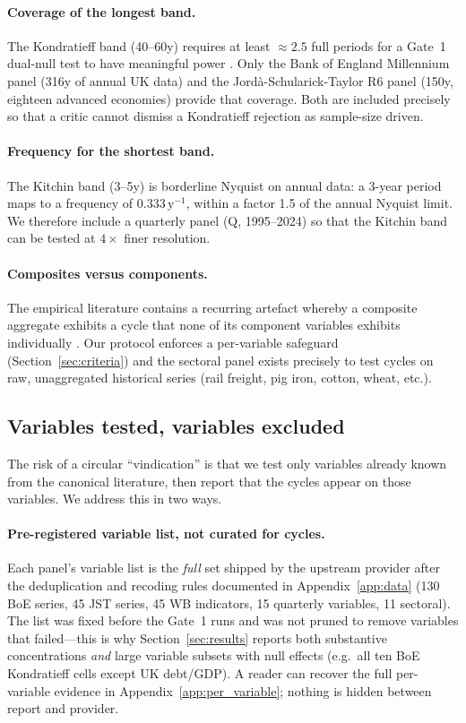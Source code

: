 \paragraph{Coverage of the longest band.}
The Kondratieff band (40--60y) requires at least \(\approx 2.5\) full
periods for a Gate~1 dual-null test to have meaningful power
\citep{torrence_compo1998}. Only the Bank of England Millennium panel
(316y of annual UK data) and the Jord\`a-Schularick-Taylor R6 panel
(150y, eighteen advanced economies) provide that coverage. Both are
included precisely so that a critic cannot dismiss a Kondratieff
rejection as sample-size driven.

\paragraph{Frequency for the shortest band.}
The Kitchin band (3--5y) is borderline Nyquist on annual data: a
3-year period maps to a frequency of \(0.333\,\mathrm{y}^{-1}\), within
a factor 1.5 of the annual Nyquist limit. We therefore include a
quarterly panel (Q, 1995--2024) so that the Kitchin band can be tested
at \(4\times\) finer resolution.

\paragraph{Composites versus components.}
The empirical literature contains a recurring artefact whereby a
composite aggregate exhibits a cycle that none of its component
variables exhibits individually \citep{wen2005}. Our protocol enforces
a per-variable safeguard (Section~\ref{sec:criteria}) and the
sectoral panel exists precisely to test cycles on raw, unaggregated
historical series (rail freight, pig iron, cotton, wheat, etc.).

\subsection{Variables tested, variables excluded}
\label{sec:variable_selection}

The risk of a circular ``vindication'' is that we test only
variables already known from the canonical literature, then
report that the cycles appear on those variables. We address this
in two ways.

\paragraph{Pre-registered variable list, not curated for cycles.}
Each panel's variable list is the \emph{full} set shipped by the
upstream provider after the deduplication and recoding rules
documented in Appendix~\ref{app:data} (130 BoE series, 45 JST
series, 45 WB indicators, 15 quarterly variables, 11 sectoral).
The list was fixed before the Gate~1 runs and was not pruned to
remove variables that failed---this is why
Section~\ref{sec:results} reports both substantive concentrations
\emph{and} large variable subsets with null effects (e.g.\ all
ten BoE Kondratieff cells except UK debt/GDP). A reader can
recover the full per-variable evidence in
Appendix~\ref{app:per_variable}; nothing is hidden between
report and provider.

